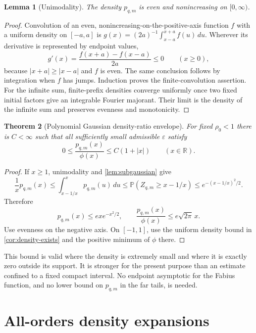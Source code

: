 \documentclass[11pt,a4paper]{article}
\numberwithin{equation}{section}
\newtheorem{theorem}{Theorem}[section]
\newtheorem{lemma}[theorem]{Lemma}
\theoremstyle{definition}
\theoremstyle{remark}
\newcommand{\PP}{\mathbb P}
\newcommand{\R}{\mathbb R}
\newcommand{\eps}{\varepsilon}
\begin{document}
\begin{lemma}[Unimodality]
\label{lem:unimodal}
The density $p_{q,m}$ is even and nonincreasing on $[0,\infty)$.
\end{lemma}
\begin{proof}
Convolution of an even, nonincreasing-on-the-positive-axis function $f$ with
a uniform density on $[-a,a]$ is
$g(x)=(2a)^{-1}\int_{x-a}^{x+a}f(u)\,du$. Wherever its derivative is
represented by endpoint values,
\[
 g'(x)=\frac{f(x+a)-f(x-a)}{2a}\le0\qquad(x\ge0),
\]
because $|x+a|\ge|x-a|$ and $f$ is even. The same conclusion follows by
integration when $f$ has jumps. Induction proves the finite-convolution
assertion. For the infinite sum, finite-prefix densities converge uniformly
once two fixed initial factors give an integrable Fourier majorant. Their
limit is the density of the infinite sum and preserves evenness and
monotonicity.
\end{proof}

\begin{theorem}[Polynomial Gaussian density-ratio envelope]
\label{thm:envelope}
For fixed $\rho_0<1$ there is $C<\infty$ such that all sufficiently small
admissible $\eps$ satisfy
\begin{equation}
 0\le\frac{p_{q,m}(x)}{\phi(x)}\le C(1+|x|)
 \qquad(x\in\R).
 \label{eq:envelope}
\end{equation}
\end{theorem}
\begin{proof}
If $x\ge1$, unimodality and \cref{lem:subgaussian} give
\[
 \frac1x p_{q,m}(x)
 \le\int_{x-1/x}^{x}p_{q,m}(u)\,du
 \le\PP(Z_{q,m}\ge x-1/x)
 \le e^{-(x-1/x)^2/2}.
\]
Therefore
\[
 p_{q,m}(x)\le ex e^{-x^2/2},
 \qquad
 \frac{p_{q,m}(x)}{\phi(x)}\le e\sqrt{2\pi}\,x.
\]
Use evenness on the negative axis. On $[-1,1]$, use the uniform density
bound in \cref{cor:density-exists} and the positive minimum of $\phi$ there.
\end{proof}

This bound is valid where the density is extremely small and where it is
exactly zero outside its support. It is stronger for the present purpose than
an estimate confined to a fixed compact interval. No endpoint asymptotic for
the Fabius function, and no lower bound on $p_{q,m}$ in the far tails, is needed.

\section{All-orders density expansions}
\label{sec:density-expansion}
\end{document}

